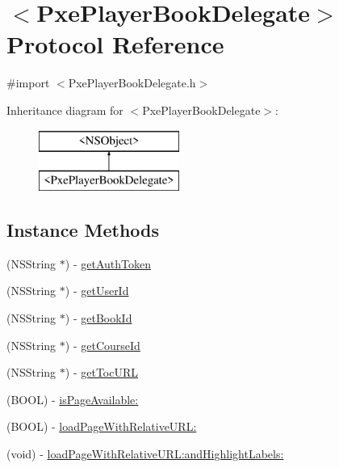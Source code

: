 \hypertarget{protocol_pxe_player_book_delegate-p}{\section{$<$Pxe\-Player\-Book\-Delegate$>$ Protocol Reference}
\label{protocol_pxe_player_book_delegate-p}
}


{\ttfamily \#import $<$Pxe\-Player\-Book\-Delegate.\-h$>$}

Inheritance diagram for $<$Pxe\-Player\-Book\-Delegate$>$\-:\begin{figure}[H]
\begin{center}
\leavevmode
\includegraphics[height=2.000000cm]{protocol_pxe_player_book_delegate-p}
\end{center}
\end{figure}
\subsection*{Instance Methods}
\begin{DoxyCompactItemize}
\item 
(N\-S\-String $\ast$) -\/ \hyperlink{protocol_pxe_player_book_delegate-p_a771400d6215f4dfdec837caf8aac2dcd}{get\-Auth\-Token}
\item 
(N\-S\-String $\ast$) -\/ \hyperlink{protocol_pxe_player_book_delegate-p_ab3fa8102745d211184d278219650e0b1}{get\-User\-Id}
\item 
(N\-S\-String $\ast$) -\/ \hyperlink{protocol_pxe_player_book_delegate-p_a6d001a4776ec1f88a60fd217d1669742}{get\-Book\-Id}
\item 
(N\-S\-String $\ast$) -\/ \hyperlink{protocol_pxe_player_book_delegate-p_a28464d6c265ff75c4841e7284547b1cf}{get\-Course\-Id}
\item 
(N\-S\-String $\ast$) -\/ \hyperlink{protocol_pxe_player_book_delegate-p_aac1a9c5f8447d689ca3480ae63970691}{get\-Toc\-U\-R\-L}
\item 
(B\-O\-O\-L) -\/ \hyperlink{protocol_pxe_player_book_delegate-p_a0ac191ff606c13517b72328ce22cc140}{is\-Page\-Available\-:}
\item 
(B\-O\-O\-L) -\/ \hyperlink{protocol_pxe_player_book_delegate-p_a5d3cee036beea1a63be6d5db307bd9fb}{load\-Page\-With\-Relative\-U\-R\-L\-:}
\item 
(void) -\/ \hyperlink{protocol_pxe_player_book_delegate-p_af75d39de105332fc8422ea0f0d7de94d}{load\-Page\-With\-Relative\-U\-R\-L\-:and\-Highlight\-Labels\-:}
\end{DoxyCompactItemize}


